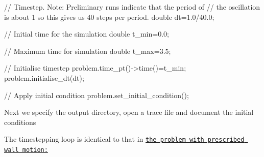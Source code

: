 \begin{DoxyCodeInclude}
 \textcolor{comment}{// Timestep. Note: Preliminary runs indicate that the period of}
 \textcolor{comment}{// the oscillation is about 1 so this gives us 40 steps per period.}
 \textcolor{keywordtype}{double} dt=1.0/40.0; 

 \textcolor{comment}{// Initial time for the simulation}
 \textcolor{keywordtype}{double} t\_min=0.0;
 
 \textcolor{comment}{// Maximum time for simulation}
 \textcolor{keywordtype}{double} t\_max=3.5; 

 \textcolor{comment}{// Initialise timestep }
 problem.time\_pt()->time()=t\_min;
 problem.initialise\_dt(dt);

 \textcolor{comment}{// Apply initial condition}
 problem.set\_initial\_condition();

\end{DoxyCodeInclude}


Next we specify the output directory, open a trace file and document the initial conditions




The timestepping loop is identical to that in \href{../../../navier_stokes/collapsible_channel/html/index.html}{\tt the problem with prescribed wall motion\+:}


